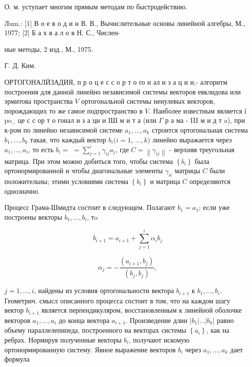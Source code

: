 \documentclass[10pt]{article}
\begin{document}
О. м. уступает многим прямым методам по быстродействию.



Лum.: [1] В о е в о д и н В. В., Вычислительные основы линейной алгебры, М., 1977; [2] Б а х в а л о в Н. С., Числен-

ные методы, 2 изд., М., 1975.

Г. Д. Ким.



ОРТОГОНАЛӤЗАДИЯ, п р о ц е с с о р т о го н ал и з а ц и и,- алгоритм построения для данной линейно независимой системы векторов евклидова или эрмитова пространства $V$ ортогональной системы ненулевых векторов, порождающих то же самое подпространство в $V$. Наиболее известным является ї $\mathrm{p} \mathrm{o}_{-}$ це с с ор т о гонал и з а ци и IШ м и т а (или $\Gamma$ р а ма - III м и д т a), при к-ром по линейно независимой системе $a_{1}, \ldots, a_{k}$ строится ортогональная система $b_{1}, \ldots, b_{k}$ такая, что каждый вектор $b_{i}(i=1$, $\ldots, k)$ линейно выражается через $a_{1}, \ldots, a_{i}$, то есть $b_{i}=$ $=\sum_{j=1}^{i} \gamma_{i j} a_{j}$, где $C=\left\|\gamma_{i j}\right\|$ - верхняя треугольная матрица. При этом можно добиться того, чтобы система $\left\{b_{i}\right\}$ была ортонормированной и чтобы диагональные элементы $\gamma_{i i}$ матрицы $C$ были положительны; этими условиями система $\left\{b_{i}\right\}$ и матрица $C$ определяются однозначно.



Процесс Грама-Шмидта состоит в следующем. Полагают $b_{1}=a_{1}$; если уже построены векторы $b_{1}, \ldots, b_{i}$, тo



\[

b_{i+1}=a_{i+1}+\sum_{j=1}^{i} \alpha_{i} b_{j}

\]



\[

\alpha_{j}=-\frac{\left(a_{i+1}, b_{j}\right)}{\left(b_{j}, b_{j}\right)},

\]



$j=1, \ldots, i$, найдены из условия ортогональности вектора $b_{i+1}$ к $b_{1}, \ldots, b_{i}$. Геометрич. смысл описанного процесса состоит в том, что на каждом шагу вектор $b_{i+1}$ является перпендикуляром, восстановленным к линейной оболочке векторов $a_{1}, \ldots, a_{i}$ до конца вектора $a_{i+1}$. Произведение длин $\left|b_{1}\right| \ldots\left|b_{k}\right|$ равно объему параллелепипеда, построенного на векторах системы $\left\{a_{i}\right\}$, как на ребрах. Нормируя полученные векторы $b_{i}$, получают искомую ортонормированную систему. Явное выражение векторов $b_{i}$ через $a_{1}, \ldots, a_{k}$ дает формула
\end{document}
